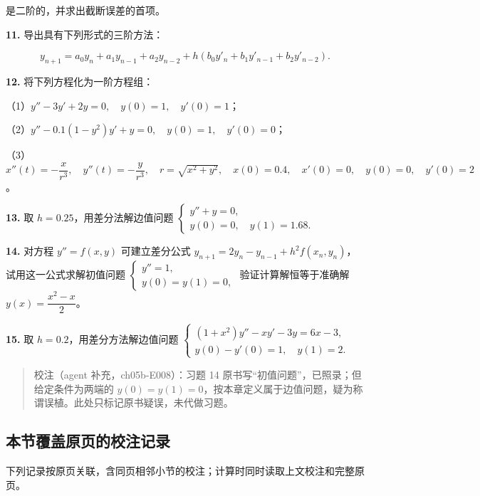 \documentclass[
  10pt,
  fontset=fandol]{ctexart}
\begin{document}
是二阶的，并求出截断误差的首项。

\textbf{11.} 导出具有下列形式的三阶方法：

\[
y_{n+1}=a_0y_n+a_1y_{n-1}+a_2y_{n-2}+h(b_0y'_n+b_1y'_{n-1}+b_2y'_{n-2}).
\]

\textbf{12.} 将下列方程化为一阶方程组：

（1）\(y''-3y'+2y=0,\quad y(0)=1,\quad y'(0)=1\)；

（2）\(y''-0.1(1-y^2)y'+y=0,\quad y(0)=1,\quad y'(0)=0\)；

（3）\(x''(t)=-\dfrac{x}{r^3},\allowbreak \quad y''(t)=-\dfrac{y}{r^3},\allowbreak \quad r=\sqrt{x^2+y^2},\allowbreak \quad x(0)=0.4,\allowbreak \quad x'(0)=0,\allowbreak \quad y(0)=0,\allowbreak \quad y'(0)=2\)。

\textbf{13.} 取 \(h=0.25\)，用差分法解边值问题 \(\begin{cases}y''+y=0,\\y(0)=0,\quad y(1)=1.68.\end{cases}\)

\textbf{14.} 对方程 \(y''=f(x,y)\) 可建立差分公式 \(y_{n+1}=2y_n-y_{n-1}+h^2f(x_n,y_n)\)，试用这一公式求解初值问题 \(\begin{cases}y''=1,\\y(0)=y(1)=0,\end{cases}\) 验证计算解恒等于准确解 \(y(x)=\dfrac{x^2-x}{2}\)。

\textbf{15.} 取 \(h=0.2\)，用差分方法解边值问题 \(\begin{cases}(1+x^2)y''-xy'-3y=6x-3,\\y(0)-y'(0)=1,\quad y(1)=2.\end{cases}\)

\begin{quote}
校注（agent 补充，ch05b-E008）：习题 14 原书写``初值问题''，已照录；但给定条件为两端的 \(y(0)=y(1)=0\)，按本章定义属于边值问题，疑为称谓误植。此处只标记原书疑误，未代做习题。
\end{quote}

\subsection{本节覆盖原页的校注记录}\label{ux672cux8282ux8986ux76d6ux539fux9875ux7684ux6821ux6ce8ux8bb0ux5f55}

下列记录按原页关联，含同页相邻小节的校注；计算时同时读取上文校注和完整原页。
\end{document}
